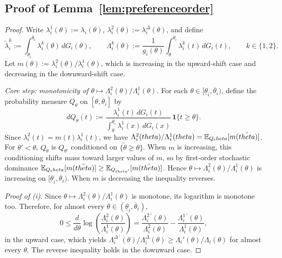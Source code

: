 \documentclass[master.tex]{subfiles}
\begin{document}

\subsection{Proof of Lemma~\ref{lem:preferenceorder}}
\begin{proof}
Write $\lambda_i^1(\theta):=\lambda_i(\theta)$, $\lambda_i^2(\theta):=\lambda_i^\Delta(\theta)$, and define
\[
\tilde\lambda_i^k := \int_{\underline\theta_i}^{\overline\theta_i}\lambda_i^k(\theta)\,dG_i(\theta), \qquad \Lambda_i^k(\theta) := \frac{1}{g_i(\theta)}\int_\theta^{\overline\theta_i}\lambda_i^k(t)\,dG_i(t), \qquad k\in\{1,2\}.
\]
Let $m(\theta):=\lambda_i^2(\theta)/\lambda_i^1(\theta)$, which is increasing in the upward-shift case and decreasing in the downward-shift case.


\noindent\textit{Core step: monotonicity of $\theta\mapsto\Lambda_i^2(\theta)/\Lambda_i^1(\theta)$.}
For each $\theta\in[\underline\theta_i,\overline\theta_i)$, define the probability measure $Q_\theta$ on $[\theta,\overline\theta_i]$ by
\[
dQ_\theta(t) := \frac{\lambda_i^1(t)\,dG_i(t)}{\displaystyle\int_\theta^{\overline\theta_i}\lambda_i^1(x)\,dG_i(x)}\,\mathbf{1}\{t\ge\theta\}.
\]
Since $\lambda_i^2(t)=m(t)\lambda_i^1(t)$, we have $\Lambda_i^2(theta)/\Lambda_i^1(theta) = \mathbb{E}_{Q_theta}[m(\tilde{theta})]$. For $\theta'<\theta$, $Q_\theta$ is $Q_{\theta'}$ conditioned on $\{\tilde\theta\ge\theta\}$. When $m$ is increasing, this conditioning shifts mass toward larger values of $m$, so by first-order stochastic dominance $\mathbb{E}_{Q_theta}[m(\tilde{theta})] \ge \mathbb{E}_{Q_{theta'}}[m(\tilde{theta})]$. Hence $\theta\mapsto\Lambda_i^2(\theta)/\Lambda_i^1(\theta)$ is increasing on $[\underline\theta_i,\overline\theta_i)$. When $m$ is decreasing the inequality reverses.


\noindent\textit{Proof of (i).}
Since $\theta\mapsto\Lambda_i^2(\theta)/\Lambda_i^1(\theta)$ is monotone, its logarithm is monotone too. Therefore, for almost every $\theta\in(\underline\theta_i,\overline\theta_i)$,
\[
0 \le \frac{d}{d\theta}\log\!\left(\frac{\Lambda_i^2(\theta)}{\Lambda_i^1(\theta)}\right) = \frac{\Lambda_i^{2\,\prime}(\theta)}{\Lambda_i^2(\theta)} - \frac{\Lambda_i^{1\,\prime}(\theta)}{\Lambda_i^1(\theta)},
\]
in the upward case, which yields $\Lambda_i^{\Delta\,\prime}(\theta)/\Lambda_i^\Delta(\theta) \ge \Lambda_i'(\theta)/\Lambda_i(\theta)$ for almost every $\theta$. The reverse inequality holds in the downward case.



\end{proof}
\end{document}
